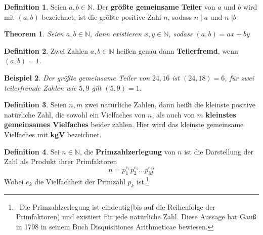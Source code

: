 \documentclass[12pt,oneside]{article}
\newtheorem{theorem}{Theorem}[section]
\newtheorem{example}[theorem]{Beispiel}
\theoremstyle{remark}
\theoremstyle{definition}
\newtheorem{definition}{Definition}[section]
\begin{document}
\theoremstyle{definition}
\begin{definition}\label{Df_1}
Seien $a,b \in \mathbb{N}$. Der \textbf{größte gemeinsame Teiler} von $a$ und $b$ wird mit $(a,b)$ bezeichnet, ist die größte positive Zahl $n$, sodass $n \mid a$ und $n$ $ \mid b$
\end{definition}

\smallskip

\begin{theorem}
Seien $a,b \in \mathbb{N}$, dann existieren $x,y \in \mathbb{N}$, sodass $(a,b) = ax + by$ 
\end{theorem}

\smallskip

\begin{definition}\label{Df_2}
Zwei Zahlen $a,b \in \mathbb{N}$ heißen genau dann \textbf{Teilerfremd}, wenn $(a,b) = 1$.
\end{definition}

\begin{example}
Der größte gemeinsame Teiler von $24,16$ ist $(24,18) = 6$, für zwei teilerfremde Zahlen wie $5,9$ gilt $(5,9) = 1$. 
\end{example}

\smallskip 



\smallskip

\begin{definition}
Seien $n, m$ zwei natürliche Zahlen, dann heißt die kleinste positive natürliche Zahl, die sowohl ein Vielfaches von $n$, als auch von $m$ \textbf{kleinstes gemeinsames Vielfaches} beider zahlen. Hier wird das kleinste gemeinsame Vielfaches mit \textbf{kgV} bezeichnet.
\end{definition}

\smallskip

\begin{definition}\label{Df_5}
Sei $n \in \mathbb{N}$, die \textbf{Primzahlzerlegung} von $n$ ist die Darstellung der Zahl als Produkt ihrer Primfaktoren \newline
\begin{equation}
    n = p_{1}^{e_{1}}p_{2}^{e_{2}}...p_{M}^{e_{M}}
\end{equation}
Wobei $e_{k}$ die Vielfachheit der Primzahl $p_{k}$ ist.\footnote{$\,$ Die Primzahlzerlegung ist eindeutig(bis auf die Reihenfolge der Primfaktoren) und existiert für jede natürliche Zahl. Diese Aussage hat Gauß in 1798 in seinem Buch Disquisitiones Arithmeticae bewiesen.\cite{gau-book}}
\end{definition}
\end{document}
